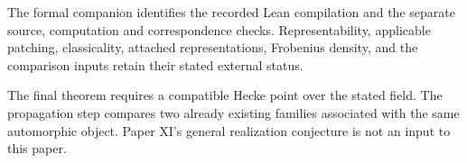 The formal companion identifies the recorded Lean compilation and the separate source, computation and correspondence checks. Representability, applicable patching, classicality, attached representations, Frobenius density, and the comparison inputs retain their stated external status.

The final theorem requires a compatible Hecke point over the stated field. The propagation step compares two already existing families associated with the same automorphic object. Paper XI's general realization conjecture is not an input to this paper.
\clearpage
{\setlength{\parskip}{0pt}\tableofcontents}
\clearpage
